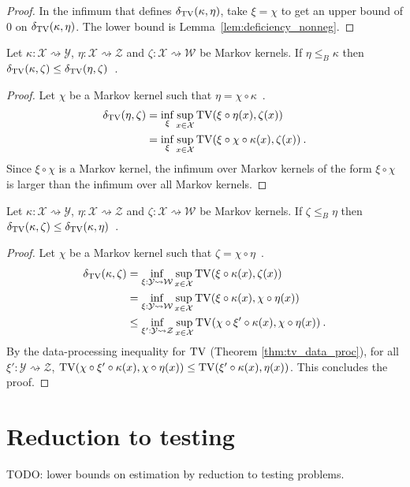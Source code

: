 \begin{proof}%
{}
In the infimum that defines $\delta_{\operatorname{TV}}(\kappa, \eta)$, take $\xi = \chi$ to get an upper bound of 0 on $\delta_{\operatorname{TV}}(\kappa, \eta)$. The lower bound is Lemma~\ref{lem:deficiency_nonneg}.
\end{proof}

\begin{lemma}
  \label{lem:deficiency_antimono_left}
  Let $\kappa: \mathcal X \rightsquigarrow \mathcal Y$, $\eta : \mathcal X \rightsquigarrow \mathcal Z$ and $\zeta : \mathcal X \rightsquigarrow \mathcal W$ be Markov kernels.
  If $\eta \le_B \kappa$ then $\delta_{\operatorname{TV}}(\kappa, \zeta) \le \delta_{\operatorname{TV}}(\eta, \zeta)$~.
\end{lemma}

\begin{proof}%
\uses{}
Let $\chi$ be a Markov kernel such that $\eta = \chi \circ \kappa$~.
\begin{align*}
\delta_{\operatorname{TV}}(\eta, \zeta)
&= \inf_{\xi} \sup_{x \in \mathcal X} \operatorname{TV}(\xi \circ \eta (x), \zeta(x))
\\
&= \inf_\xi \sup_{x \in \mathcal X} \operatorname{TV}(\xi \circ \chi \circ \kappa (x), \zeta(x))
\: .
\end{align*}
Since $\xi \circ \chi$ is a Markov kernel, the infimum over Markov kernels of the form $\xi \circ \chi$ is larger than the infimum over all Markov kernels.
\end{proof}

\begin{lemma}
  \label{lem:deficiency_mono_right}
  Let $\kappa: \mathcal X \rightsquigarrow \mathcal Y$, $\eta : \mathcal X \rightsquigarrow \mathcal Z$ and $\zeta : \mathcal X \rightsquigarrow \mathcal W$ be Markov kernels.
  If $\zeta \le_B \eta$ then $\delta_{\operatorname{TV}}(\kappa, \zeta) \le \delta_{\operatorname{TV}}(\kappa, \eta)$~.
\end{lemma}

\begin{proof}%
{}
Let $\chi$ be a Markov kernel such that $\zeta = \chi \circ \eta$~.
\begin{align*}
\delta_{\operatorname{TV}}(\kappa, \zeta)
&= \inf_{\xi : \mathcal Y \rightsquigarrow \mathcal W} \sup_{x \in \mathcal X} \operatorname{TV}(\xi \circ \kappa (x), \zeta(x))
\\
&= \inf_{\xi : \mathcal Y \rightsquigarrow \mathcal W} \sup_{x \in \mathcal X} \operatorname{TV}(\xi \circ \kappa (x), \chi \circ \eta(x))
\\
&\le \inf_{\xi' : \mathcal Y \rightsquigarrow \mathcal Z} \sup_{x \in \mathcal X} \operatorname{TV}(\chi \circ \xi' \circ \kappa (x), \chi \circ \eta(x))
\: .
\end{align*}
By the data-processing inequality for $\operatorname{TV}$ (Theorem \ref{thm:tv_data_proc}), for all $\xi' : \mathcal Y \rightsquigarrow \mathcal Z$, $\operatorname{TV}(\chi \circ \xi' \circ \kappa (x), \chi \circ \eta(x)) \le \operatorname{TV}(\xi' \circ \kappa (x), \eta(x))$.
This concludes the proof.
\end{proof}

\section{Reduction to testing}

TODO: lower bounds on estimation by reduction to testing problems.